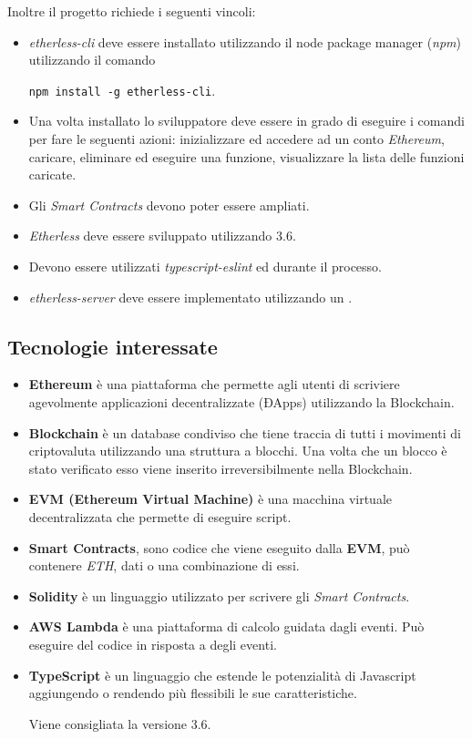 \documentclass[../studio-di-fattibilita.tex]{subfiles}
\begin{document}
Inoltre il progetto richiede i seguenti vincoli:
\begin{itemize}
      \item \textit{etherless-cli} deve essere installato utilizzando il node package manager (\textit{npm}) utilizzando
            il comando 
            
            \texttt{npm install -g etherless-cli}.
      \item Una volta installato lo sviluppatore deve essere in grado di eseguire i comandi per fare le seguenti
            azioni: inizializzare ed accedere ad un conto \textit{Ethereum}, caricare, eliminare ed eseguire una funzione,
            visualizzare la lista delle funzioni caricate.
      \item Gli \textit{Smart Contracts} devono poter essere ampliati.
      \item \textit{Etherless} deve essere sviluppato utilizzando  3.6.
      \item Devono essere utilizzati \textit{typescript-eslint} ed  durante il processo.
      \item \textit{etherless-server} deve essere implementato utilizzando un  .
\end{itemize}


\subsection{Tecnologie interessate}%
\label{sub:tecnologie_interessate}
\begin{itemize}
  \item \textbf{Ethereum} è una piattaforma che permette agli utenti di scriviere agevolmente applicazioni decentralizzate
        (ĐApps) utilizzando la Blockchain.
  \item \textbf{Blockchain} è un database condiviso che tiene traccia di tutti i movimenti di criptovaluta utilizzando
        una struttura a blocchi. Una volta che un blocco è stato verificato esso viene inserito irreversibilmente nella 
        Blockchain.
  \item \textbf{EVM (Ethereum Virtual Machine)} è una macchina virtuale decentralizzata che permette di eseguire script.
  \item \textbf{Smart Contracts}, sono codice che viene eseguito dalla \textbf{EVM}, può contenere \textit{ETH}, dati o
        una combinazione di essi.
  \item \textbf{Solidity} è un linguaggio utilizzato per scrivere gli \textit{Smart Contracts}.
  \item \textbf{AWS Lambda} è una piattaforma di calcolo \textit{} guidata dagli eventi. Può eseguire del codice 
        in risposta a degli eventi.
  \item \textbf{TypeScript} è un linguaggio che estende le potenzialità di Javascript aggiungendo o rendendo più
        flessibili le sue caratteristiche.

        Viene consigliata la versione 3.6.
\end{itemize}
\end{document}
